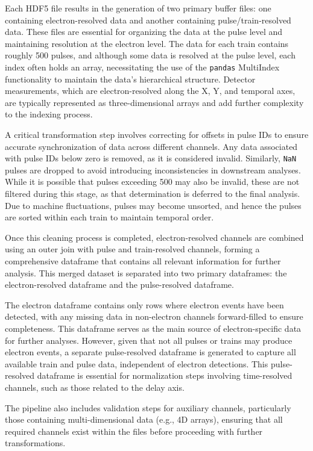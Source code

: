 Each \gls{HDF5} file results in the generation of two primary buffer files: one containing electron-resolved data and another containing pulse/train-resolved data. These files are essential for organizing the data at the pulse level and maintaining resolution at the electron level. The data for each train contains roughly 500 pulses, and although some data is resolved at the pulse level, each index often holds an array, necessitating the use of the \texttt{pandas} MultiIndex functionality to maintain the data’s hierarchical structure. Detector measurements, which are electron-resolved along the X, Y, and temporal axes, are typically represented as three-dimensional arrays and add further complexity to the indexing process.

A critical transformation step involves correcting for offsets in pulse IDs to ensure accurate synchronization of data across different channels. Any data associated with pulse IDs below zero is removed, as it is considered invalid. Similarly, \texttt{NaN} pulses are dropped to avoid introducing inconsistencies in downstream analyses. While it is possible that pulses exceeding 500 may also be invalid, these are not filtered during this stage, as that determination is deferred to the final analysis. Due to machine fluctuations, pulses may become unsorted, and hence the pulses are sorted within each train to maintain temporal order.

Once this cleaning process is completed, electron-resolved channels are combined using an outer join with pulse and train-resolved channels, forming a comprehensive dataframe that contains all relevant information for further analysis. This merged dataset is separated into two primary dataframes: the electron-resolved dataframe and the pulse-resolved dataframe.

The electron dataframe contains only rows where electron events have been detected, with any missing data in non-electron channels forward-filled to ensure completeness. This dataframe serves as the main source of electron-specific data for further analyses. However, given that not all pulses or trains may produce electron events, a separate pulse-resolved dataframe is generated to capture all available train and pulse data, independent of electron detections. This pulse-resolved dataframe is essential for normalization steps involving time-resolved channels, such as those related to the delay axis.

The pipeline also includes validation steps for auxiliary channels, particularly those containing multi-dimensional data (e.g., 4D arrays), ensuring that all required channels exist within the files before proceeding with further transformations.

